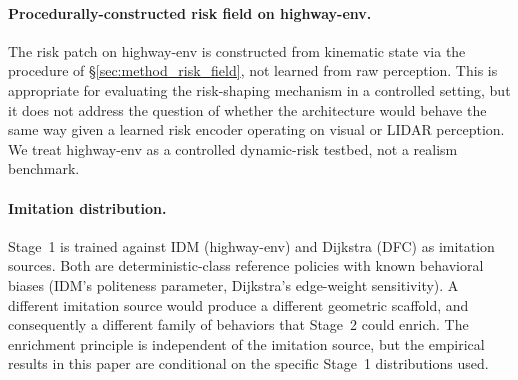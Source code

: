 \paragraph{Procedurally-constructed risk field on highway-env.}
The risk patch on highway-env is constructed from kinematic state via the procedure of \S\ref{sec:method_risk_field}, not learned from raw perception.
This is appropriate for evaluating the risk-shaping mechanism in a controlled setting, but it does not address the question of whether the architecture would behave the same way given a learned risk encoder operating on visual or LIDAR perception.
We treat highway-env as a controlled dynamic-risk testbed, not a realism benchmark.

\paragraph{Imitation distribution.}
Stage~1 is trained against IDM (highway-env) and Dijkstra (DFC) as imitation sources.
Both are deterministic-class reference policies with known behavioral biases (IDM's politeness parameter, Dijkstra's edge-weight sensitivity).
A different imitation source would produce a different geometric scaffold, and consequently a different family of behaviors that Stage~2 could enrich.
The enrichment principle is independent of the imitation source, but the empirical results in this paper are conditional on the specific Stage~1 distributions used.
